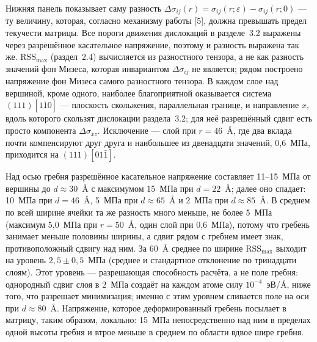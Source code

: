 Нижняя панель показывает саму разность
$\Delta\sigma_{ij}(r) = \sigma_{ij}(r;\varepsilon) - \sigma_{ij}(r;0)$ ---
ту величину, которая, согласно механизму работы [5], должна превышать
предел текучести матрицы. Все пороги движения дислокаций в разделе~3.2
выражены через разрешённое касательное напряжение, поэтому и разность
выражена так же. $\mathrm{RSS}_{\max}$ (раздел~2.4) вычисляется из разностного тензора, а не как разность значений фон Мизеса,
которая инвариантом $\Delta\sigma_{ij}$ не является; рядом построено
напряжение фон Мизеса самого разностного тензора. В каждом слое над
вершиной, кроме одного, наиболее благоприятной оказывается система $(111)[1\bar{1}0]$ ---
плоскость скольжения, параллельная границе, и направление $x$, вдоль
которого скользят дислокации раздела~3.2; для неё разрешённый сдвиг есть
просто компонента $\Delta\sigma_{xz}$. Исключение --- слой при
$r = 46$~\AA{}, где два вклада почти компенсируют друг друга и наибольшее
из двенадцати значений, 0{,}6~МПа, приходится на $(111)[01\bar{1}]$.

Над осью гребня разрешённое касательное напряжение составляет 11--15~МПа
от вершины до $d \approx 30$~\AA{} с максимумом 15~МПа при $d = 22$~\AA{};
далее оно спадает: 10~МПа при $d = 46$~\AA{}, 5~МПа при $d \approx 65$~\AA{}
и 2~МПа при $d \approx 85$~\AA{}. В среднем по всей ширине ячейки та же
разность много меньше, не более 5~МПа (максимум 5{,}0~МПа при $r = 50$~\AA{}, один слой при 0{,}6~МПа),
потому что гребень занимает меньше половины ширины, а сдвиг рядом с гребнем
имеет знак, противоположный сдвигу над ним. За 60~\AA{} среднее по ширине
$\mathrm{RSS}_{\max}$ выходит на уровень $2{,}5 \pm 0{,}5$~МПа (среднее и
стандартное отклонение по тринадцати слоям). Этот уровень --- разрешающая
способность расчёта, а не поле гребня: однородный сдвиг слоя в 2~МПа создаёт
на каждом атоме силу $10^{-4}$~эВ/\AA{}, ниже того, что разрешает
минимизация; именно с этим уровнем сливается поле на оси при
$d \approx 80$~\AA{}. Напряжение, которое деформированный гребень посылает
в матрицу, таким образом, локально: 15~МПа непосредственно над ним в
пределах одной высоты гребня и втрое меньше в среднем по области вдвое шире
гребня.

